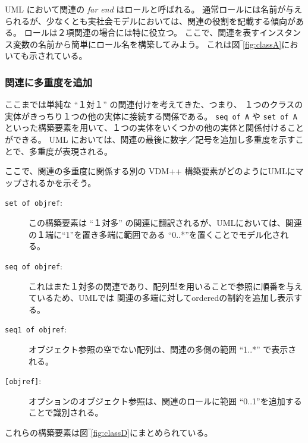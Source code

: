 \documentclass[\pformat,12pt]{jarticle}
\newcommand{\vdmpp}{VDM++}
\begin{document}
\renewcommand{\textfraction}{0}
                              

\renewcommand{\topfraction}{1}
                              

\setcounter{totalnumber}{100} 
\setcounter{topnumber}{100} 
   
UML において関連の {\it far end} はロールと呼ばれる。
通常ロールには名前が与えられるが、少なくとも実社会モデルにおいては、関連の役割を記載する傾向がある。
ロールは２項関連の場合には特に役立つ。
ここで、関連を表すインスタンス変数の名前から簡単にロール名を構築してみよう。
これは図‾\ref{fig:classA}においても示されている。

\subsubsection*{関連に多重度を追加}
  
ここまでは単純な ``１対１'' の関連付けを考えてきた、つまり、 １つのクラスの実体がきっちり１つの他の実体に接続する関係である。
 {\tt seq of A} や {\tt set of A}といった構築要素を用いて、１つの実体をいくつかの他の実体と関係付けることができる。
 UML においては、関連の最後に数字／記号を追加し多重度を示すことで、多重度が表現される。

ここで、関連の多重度に関係する別の \vdmpp{} 構築要素がどのようにUMLにマップされるかを示そう。

\begin{description}
\item [{\tt set of objref}:]  この構築要素は ``１対多'' の関連に翻訳されるが、UMLにおいては、関連の１端に``1''を置き多端に範囲である ``0..*''を置くことでモデル化される。
\item [{\tt seq of objref}:]  これはまた１対多の関連であり、配列型を用いることで参照に順番を与えているため、UMLでは 関連の多端に対して{ordered}の制約を追加し表示する。
\item [{\tt seq1 of objref}:]  オブジェクト参照の空でない配列は、関連の多側の範囲 ``1..*'' で表示される。  
\item [{\tt [objref]}:]  オプションのオブジェクト参照は、関連のロールに範囲 ``0..1''を追加することで識別される。
\end{description}

これらの構築要素は図‾\ref{fig:classD}にまとめられている。
\end{document}
